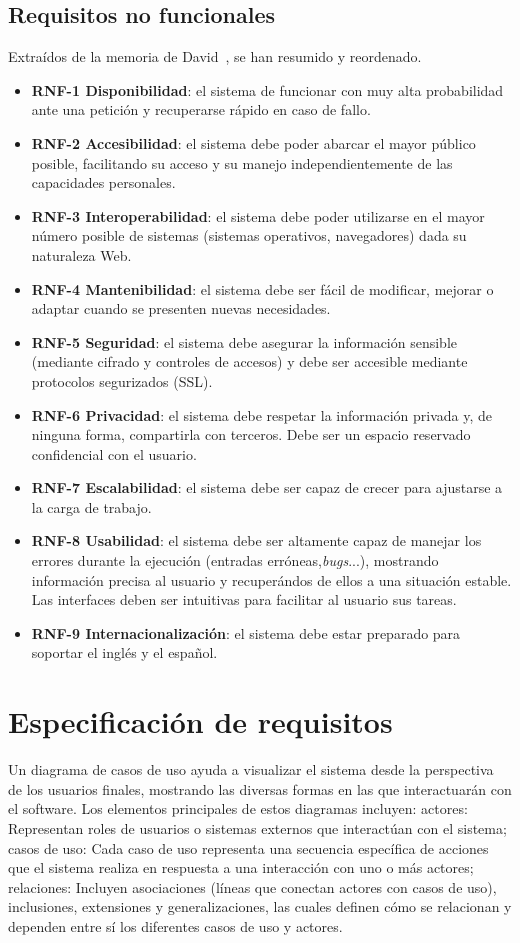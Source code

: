 \subsection{Requisitos no funcionales}
Extraídos de la memoria de David~\cite{TFG:David}, se han resumido y reordenado.
\begin{itemize}
	\item \textbf{RNF-1 Disponibilidad}: el sistema de funcionar con muy alta probabilidad ante una petición y recuperarse rápido en caso de fallo.
	\item \textbf{RNF-2 Accesibilidad}: el sistema debe poder abarcar el mayor público posible, facilitando su acceso y su manejo independientemente de las capacidades personales.
	\item \textbf{RNF-3 Interoperabilidad}: el sistema debe poder utilizarse en el mayor número posible de sistemas (sistemas operativos, navegadores) dada su naturaleza Web.
	\item \textbf{RNF-4 Mantenibilidad}: el sistema debe ser fácil de modificar, mejorar o adaptar cuando se presenten nuevas necesidades.
	\item \textbf{RNF-5 Seguridad}: el sistema debe asegurar la información sensible (mediante cifrado y controles de accesos) y debe ser accesible mediante protocolos segurizados (SSL).
	\item \textbf{RNF-6 Privacidad}: el sistema debe respetar la información privada y, de ninguna forma, compartirla con terceros. Debe ser un espacio reservado confidencial con el usuario.
	\item \textbf{RNF-7 Escalabilidad}: el sistema debe ser capaz de crecer para ajustarse a la carga de trabajo.
	\item \textbf{RNF-8 Usabilidad}: el sistema debe ser altamente capaz de manejar los errores durante la ejecución (entradas erróneas,\textit{bugs}...), mostrando información precisa al usuario y recuperándos de ellos a una situación estable. Las interfaces deben ser intuitivas para facilitar al usuario sus tareas.
	\item \textbf{RNF-9 Internacionalización}: el sistema debe estar preparado para soportar el inglés y el español.
	
\end{itemize}

\section{Especificación de requisitos}
Un diagrama de casos de uso ayuda a visualizar el sistema desde la perspectiva de los usuarios finales, mostrando las diversas formas en las que interactuarán con el software. Los elementos principales de estos diagramas incluyen: actores: Representan roles de usuarios o sistemas externos que interactúan con el sistema; casos de uso: Cada caso de uso representa una secuencia específica de acciones que el sistema realiza en respuesta a una interacción con uno o más actores; relaciones: Incluyen asociaciones (líneas que conectan actores con casos de uso), inclusiones, extensiones y generalizaciones, las cuales definen cómo se relacionan y dependen entre sí los diferentes casos de uso y actores.


